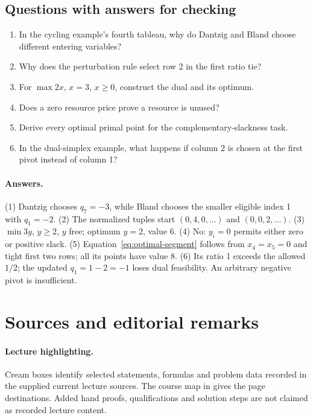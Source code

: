\documentclass[11pt,a4paper]{article}
\begin{document}
\subsection{Questions with answers for checking}
\begin{enumerate}[leftmargin=*,itemsep=2pt]
  \item In the cycling example's fourth tableau, why do Dantzig and Bland choose
        different entering variables?
  \item Why does the perturbation rule select row 2 in the first ratio tie?
  \item For $\max2x$, $x=3$, $x\geq0$, construct the dual and its optimum.
  \item Does a zero resource price prove a resource is unused?
  \item Derive every optimal primal point for the complementary-slackness task.
  \item In the dual-simplex example, what happens if column 2 is chosen at the
        first pivot instead of column 1?
\end{enumerate}
\paragraph{Answers.}
(1) Dantzig chooses $q_7=-3$, while Bland chooses the smaller eligible index 1
with $q_1=-2$.
(2) The normalized tuples start $(0,4,0,\ldots)$ and $(0,0,2,\ldots)$.
(3) $\min3y$, $y\geq2$, $y$ free; optimum $y=2$, value 6.
(4) No: $y_i=0$ permits either zero or positive slack.
(5) Equation~\eqref{eq:optimal-segment} follows from $x_4=x_5=0$ and tight
first two rows; all its points have value 8.
(6) Its ratio 1 exceeds the allowed $1/2$; the updated $q_1=1-2=-1$ loses
dual feasibility. An arbitrary negative pivot is insufficient.

\clearpage
\section{Sources and editorial remarks}\label{sec:sources}
\paragraph{Lecture highlighting.}
Cream boxes identify selected statements, formulas and problem data recorded in
the supplied current lecture sources. The course map in
 gives the page destinations. Added hand proofs,
qualifications and solution steps are not claimed as recorded lecture content.
\end{document}
